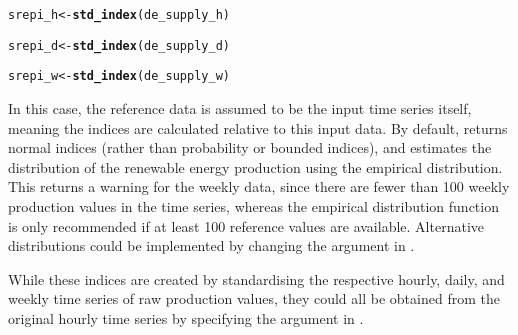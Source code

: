 \documentclass[article,shortnames,nojss]{jss}\usepackage[]{graphicx}\usepackage[]{xcolor}
\makeatletter
\newcommand{\hlstd}[1]{\textcolor[rgb]{0.345,0.345,0.345}{#1}}%
\newcommand{\hlkwb}[1]{\textcolor[rgb]{0.69,0.353,0.396}{#1}}%
\newcommand{\hlkwd}[1]{\textcolor[rgb]{0.737,0.353,0.396}{\textbf{#1}}}%
\newenvironment{kframe}{%
 \def\at@end@of@kframe{}%
 \ifinner\ifhmode%
  \def\at@end@of@kframe{\end{minipage}}%
  \begin{minipage}{\columnwidth}%
 \fi\fi%
 \def\FrameCommand##1{\hskip\@totalleftmargin \hskip-\fboxsep
 \colorbox{shadecolor}{##1}\hskip-\fboxsep
     \hskip-\linewidth \hskip-\@totalleftmargin \hskip\columnwidth}%
 \MakeFramed {\advance\hsize-\width
   \@totalleftmargin\z@ \linewidth\hsize
   \@setminipage}}%
 {\par\unskip\endMakeFramed%
 \at@end@of@kframe}
\newenvironment{knitrout}{}{} %
\makeatother
\begin{document}
\begin{knitrout}
\color{fgcolor}\begin{kframe}
\begin{alltt}
\hlstd{srepi_h} \hlkwb{<-} \hlkwd{std_index}\hlstd{(de_supply_h)}
\end{alltt}


{\ttfamily\noindent\bfseries{}}\begin{alltt}
\hlstd{srepi_d} \hlkwb{<-} \hlkwd{std_index}\hlstd{(de_supply_d)}
\end{alltt}


{\ttfamily\noindent\bfseries{}}\begin{alltt}
\hlstd{srepi_w} \hlkwb{<-} \hlkwd{std_index}\hlstd{(de_supply_w)}
\end{alltt}


{\ttfamily\noindent\bfseries{}}\end{kframe}
\end{knitrout}

In this case, the reference data  is assumed to be the input time series itself, meaning the indices are calculated relative to this input data. By default,  returns normal indices (rather than probability or bounded indices), and estimates the distribution of the renewable energy production using the empirical distribution. This returns a warning for the weekly data, since there are fewer than 100 weekly production values in the time series, whereas the empirical distribution function is only recommended if at least 100 reference values are available. Alternative distributions could be implemented by changing the  argument in .

While these indices are created by standardising the respective hourly, daily, and weekly time series of raw production values, they could all be obtained from the original hourly time series by specifying the  argument in .
\end{document}

